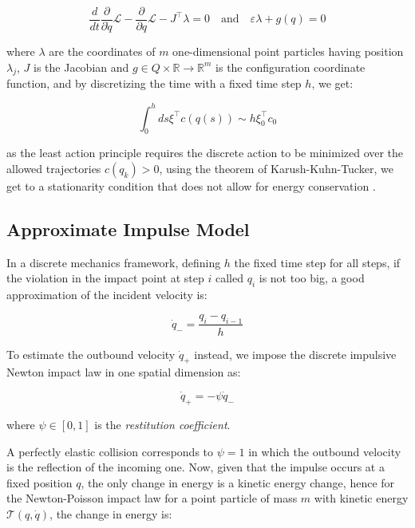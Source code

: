 \begin{equation}
    \frac{d}{dt} \frac{\partial}{\partial \dot{q}} \mathcal{L} - \frac{\partial}{\partial q} \mathcal{L} - J^\top \lambda = 0 \quad \text{and} \quad \varepsilon\lambda + g(q) = 0
\end{equation}

where $\lambda$ are the coordinates of $m$ one-dimensional point particles having position $\lambda _{j}$, $J$ is the Jacobian and  $g \in Q \times \mathbb{R} \rightarrow \mathbb{R} ^m$ is the configuration coordinate function, and by discretizing the time with a fixed time step $h$, we get:

\begin{equation}
    \int _0 ^h ds\xi^\top c(q(s)) \sim h\xi_0 ^\top c_0
\end{equation}

as the least action principle requires the discrete action to be minimized over the allowed trajectories $c(q_k) >0$, using the theorem of Karush-Kuhn-Tucker, we get to a stationarity condition that does not allow for energy conservation \citep{lacoursiere_ghosts_2007}.

\subsection{Approximate Impulse Model}

In a discrete mechanics framework, defining $h$ the fixed time step for all steps, if the violation in the impact point at step $i$ called $q _i$ is not too big, a good approximation of the incident velocity is:

\begin{equation}
    \dot{q} _{-} = \frac{q _i - q _{i-1}}{h}
\end{equation}

To estimate the outbound velocity $\dot{q} _{+}$ instead, we impose the discrete impulsive Newton impact law in one spatial dimension as:

\begin{equation}
    \dot{q} _{+} = -\psi \dot{q} _{-}
\end{equation}

where $\psi \in [0,1]$ is the \textit{restitution coefficient}.

A perfectly elastic collision corresponds to $\psi = 1$ in which the outbound velocity is the reflection of the incoming one. Now, given that the impulse occurs at a fixed position $q$, the only change in energy is a kinetic energy change, hence for the Newton-Poisson impact law for a point particle of mass $m$ with kinetic energy $\mathcal{T}(q, \dot{q})$, the change in energy is:

